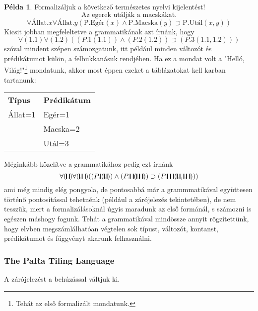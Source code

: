 \documentclass[a4paper]{article}
\newcommand{\stick}{\rule[-.2ex]{.12em}{1.8ex}}
\theoremstyle{definition}
\newtheorem{pelda}{Példa}[section]
\begin{document}
{

\begin{pelda}
Formalizáljuk a következő természetes nyelvi kijelentést!
$$
\text{Az egerek utálják a macskákat.}
$$
$$\forall \text{Állat.}x \forall \text{Állat.}y ( \text{P.Egér}(x) \wedge \text{P.Macska}(y)  \supset \text{P.Utál}(x, y))$$
Kicsit jobban megfeleltetve a grammatikának azt írnánk, hogy
$$\forall (1.1) \forall (1.2) (
(P.1 (1.1)) \wedge (P.2 (1.2))
\supset
(P.3(1.1, 1.2))
)$$
szóval mindent szépen számozgatunk, itt például minden változót és prédikátumot külön, a felbukkanásuk rendjében. Ha ez a mondat volt a "Helló, Világ!"\footnote{Tehát az els\H o formalizált mondatunk.} mondatunk, akkor most éppen ezeket a táblázatokat kell karban tartanunk:

\begin{center}
\begin{tabular}{ll}
\centering
\textbf{Típus} & \textbf{Prédikátum}\\
Állat=1& Egér=1\\
& Macska=2\\
& Utál=3
\end{tabular}
\end{center}

Méginkább közelítve a grammatikához pedig ezt írnánk
$$\forall (\stick . \stick) \forall (\stick . \stick \ \stick) (
(P . \stick (\stick . \stick)) \wedge (P . \stick \ \stick (\stick . \stick \ \stick))
\supset
(P . \stick \ \stick \ \stick(\stick . \stick, \stick . \stick \ \stick))
)$$
ami még mindig elég pongyola, de pontosabbá már a grammmatikával együttesen
történ\H o pontosítással tehetnénk (például a zárójelezés tekintetében), de nem tesszük, mert a formalizálásoknál úgyis maradunk az els\H o formánál, s számozni is egészen máshogy fogunk. Tehát a grammatikával mindössze annyit rögzítettünk, hogy elvben megszámlálhatóan végtelen sok típust, változót, kontanst, prédikátumot és függvényt akarunk felhasználni.
\end{pelda}
}

\subsubsection{The PaRa Tiling Language}

A zárójelezést a behúzással váltjuk ki.
\end{document}
